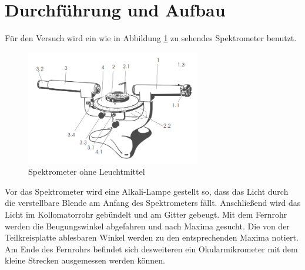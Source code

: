 \section{Durchführung und Aufbau}
\label{sec:Durchführung}
Für den Versuch wird ein wie in Abbildung \ref{fig:Spek} zu sehendes Spektrometer benutzt.
\begin{figure}
  \centering
  \includegraphics[height=5cm]{picture/Aufbau.png}
  \caption{Spektrometer ohne Leuchtmittel \cite{sample}}
  \label{fig:Spek}
\end{figure}
Vor das Spektrometer wird eine Alkali-Lampe gestellt so, dass das Licht durch die verstellbare Blende am Anfang des Spektrometers fällt. Anschließend wird das Licht im Kollomatorrohr gebündelt und am Gitter gebeugt. Mit dem Fernrohr werden die Beugungswinkel abgefahren und nach Maxima gesucht. Die von der Teilkreisplatte ablesbaren Winkel werden zu den entsprechenden Maxima notiert. Am Ende des Fernrohrs befindet sich desweiteren ein Okularmikrometer mit dem kleine Strecken ausgemessen werden können.

